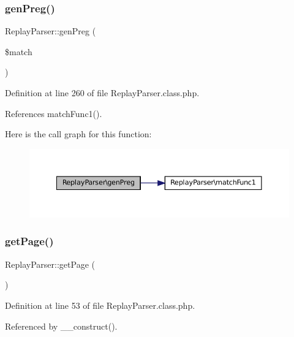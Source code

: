 \subsubsection{\texorpdfstring{gen\+Preg()}{genPreg()}}
{\footnotesize\ttfamily Replay\+Parser\+::gen\+Preg (\begin{DoxyParamCaption}\item[{}]{\$match }\end{DoxyParamCaption})}



Definition at line 260 of file Replay\+Parser.\+class.\+php.



References match\+Func1().

Here is the call graph for this function\+:\nopagebreak
\begin{figure}[H]
\begin{center}
\leavevmode
\includegraphics[width=350pt]{class_replay_parser_a743e78021b6754ea36c804074e07da2d_cgraph}
\end{center}
\end{figure}
\mbox{\label{class_replay_parser_aba95b604703c0aae7956c51d11f3078b}} 
\subsubsection{\texorpdfstring{get\+Page()}{getPage()}}
{\footnotesize\ttfamily Replay\+Parser\+::get\+Page (\begin{DoxyParamCaption}{ }\end{DoxyParamCaption})\hspace{0.3cm}{\ttfamily [private]}}



Definition at line 53 of file Replay\+Parser.\+class.\+php.



Referenced by \+\_\+\+\_\+construct().

